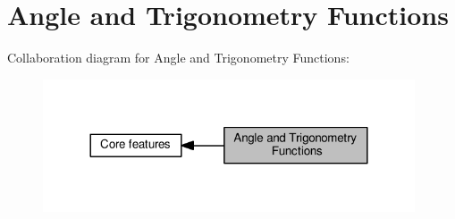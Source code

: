 \hypertarget{group__core__func__trigonometric}{}\section{Angle and Trigonometry Functions}
\label{group__core__func__trigonometric}
Collaboration diagram for Angle and Trigonometry Functions\+:
\nopagebreak
\begin{figure}[H]
\begin{center}
\leavevmode
\includegraphics[width=312pt]{dc/d43/group__core__func__trigonometric}
\end{center}
\end{figure}
